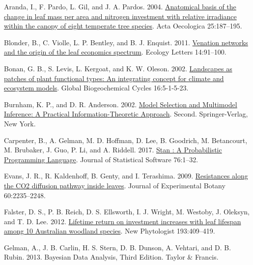 \documentclass[
  12pt,
]{article}
\newlength{\cslhangindent} %
\newlength{\cslentryspacingunit} %
\newenvironment{CSLReferences}[2] %
 {%
  \setlength{\parindent}{0pt} %
  \ifodd #1 %
  \let\oldpar\par %
  \def\par{\hangindent=\cslhangindent\oldpar} %
  \fi %
  \setlength{\parskip}{#2\cslentryspacingunit} %
 }%
 {} %
\begin{document}
\hypertarget{refs}{}
\begin{CSLReferences}{1}{0}
\leavevmode{}%
Aranda, I., F. Pardo, L. Gil, and J. A. Pardos. 2004. \href{https://doi.org/10.1016/j.actao.2004.01.003}{Anatomical basis of the change in leaf mass per area and nitrogen investment with relative irradiance within the canopy of eight temperate tree species}. Acta Oecologica 25:187--195.

\leavevmode{}%
Blonder, B., C. Violle, L. P. Bentley, and B. J. Enquist. 2011. \href{https://doi.org/10.1111/j.1461-0248.2010.01554.x}{Venation networks and the origin of the leaf economics spectrum}. Ecology Letters 14:91--100.

\leavevmode{}%
Bonan, G. B., S. Levis, L. Kergoat, and K. W. Oleson. 2002. \href{https://doi.org/10.1029/2000GB001360}{Landscapes as patches of plant functional types: {An} integrating concept for climate and ecosystem models}. Global Biogeochemical Cycles 16:5-1-5-23.

\leavevmode{}%
Burnham, K. P., and D. R. Anderson. 2002. \href{https://doi.org/10.1007/b97636}{Model {Selection} and {Multimodel Inference}: {A Practical Information}-{Theoretic Approach}}. Second. {Springer-Verlag}, {New York}.

\leavevmode{}%
Carpenter, B., A. Gelman, M. D. Hoffman, D. Lee, B. Goodrich, M. Betancourt, M. Brubaker, J. Guo, P. Li, and A. Riddell. 2017. \href{https://doi.org/10.18637/jss.v076.i01}{Stan : {A Probabilistic Programming Language}}. Journal of Statistical Software 76:1--32.

\leavevmode{}%
Evans, J. R., R. Kaldenhoff, B. Genty, and I. Terashima. 2009. \href{https://doi.org/10.1093/jxb/erp117}{Resistances along the {CO2} diffusion pathway inside leaves}. Journal of Experimental Botany 60:2235--2248.

\leavevmode{}%
Falster, D. S., P. B. Reich, D. S. Ellsworth, I. J. Wright, M. Westoby, J. Oleksyn, and T. D. Lee. 2012. \href{https://doi.org/10.1111/j.1469-8137.2011.03940.x}{Lifetime return on investment increases with leaf lifespan among 10 {Australian} woodland species}. New Phytologist 193:409--419.

\leavevmode{}%
Gelman, A., J. B. Carlin, H. S. Stern, D. B. Dunson, A. Vehtari, and D. B. Rubin. 2013. Bayesian {Data Analysis}, {Third Edition}. {Taylor \& Francis}.


\end{CSLReferences}
\end{document}

